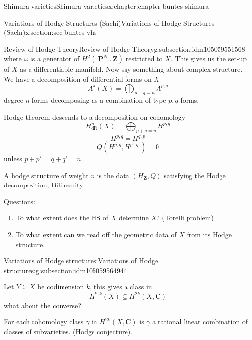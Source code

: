 \documentclass[oneside,10pt,]{book}
\numberwithin{equation}{section}
\newcommand{\ZZ}{\mathbf{Z}}
\newcommand{\CC}{\mathbf{C}}
\newcommand{\dR}{\mathrm{dR}}
\DeclareMathOperator{\PP}{\mathbf{P}}
\begin{document}
\begin{chapterptx}{Shimura varieties}{}{Shimura varieties}{}{}{x:chapter:chapter-buntes-shimura}
\begin{sectionptx}{Variations of Hodge Structures (Sachi)}{}{Variations of Hodge Structures (Sachi)}{}{}{x:section:sec-buntes-vhs}
\begin{subsectionptx}{Review of Hodge Theory}{}{Review of Hodge Theory}{}{}{g:subsection:idm105059551568}
\begin{equation*}
\end{equation*}
where \(\omega\) is a generator of \(H^2( \PP^N , \ZZ)\) restricted to \(X\). This gives us the set-up of \(X\) as a differentiable manifold. Now say something about complex structure. We have a decomposition of differential forms on \(X\)%
\begin{equation*}
A^n(X) = \bigoplus_{p+q  =n} A^{p,q}
\end{equation*}
degree \(n\) forms decomposing as a combination of type \(p,q\) forms.%
\par
Hodge theorem descends to a decomposition on cohomology%
\begin{equation*}
H^n_\dR(X) = \bigoplus_{p+q = n} H^{p,q}
\end{equation*}
%
\begin{equation*}
H^{p,q} = \overline{H^{q,p}}
\end{equation*}
%
\begin{equation*}
Q(H^{p,q}, H^{p',q'}) = 0
\end{equation*}
unless \(p+p' = q+q' = n\).%
\par
A hodge structure of weight \(n\) is the data \((H_\ZZ, Q)\) satisfying the Hodge decomposition, Bilinearity%
\par
Questions:%
\begin{enumerate}
\item{}To what extent does the HS of \(X\) determine \(X\)? (Torelli problem)%
\item{}To what extent can we read off the geometric data of \(X\) from its Hodge structure.%
\end{enumerate}
%
\end{subsectionptx}
%
%
\typeout{************************************************}
\typeout{************************************************}
%
\begin{subsectionptx}{Variations of Hodge structures:}{}{Variations of Hodge structures:}{}{}{g:subsection:idm105059564944}
\begin{introduction}{}%
Let \(Y \subseteq X\) be codimension \(k\), this gives a class in%
\begin{equation*}
H^{k,k}(X) \subseteq H^{2k}(X,\CC)
\end{equation*}
what about the converse?%
\par
For each cohomology class \(\gamma\)  in \(H^{2k} (X,\CC)\) is \(\gamma\) a rational linear combination of classes of subvarieties. (Hodge conjecture).%
\end{introduction}%

\end{subsectionptx}
\end{sectionptx}
\end{chapterptx}
\end{document}
